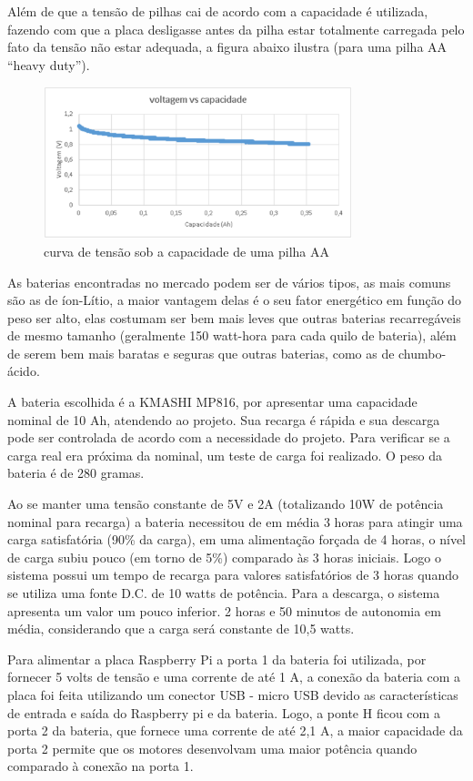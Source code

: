 Além de que a tensão de pilhas cai de acordo com a capacidade é utilizada, fazendo com que a placa desligasse antes da pilha estar
totalmente carregada pelo fato da tensão não estar adequada, a figura abaixo ilustra (para uma pilha AA “heavy duty”).

\begin{figure}[H]
    \centering
    \includegraphics[width=0.8\textwidth]{figuras/volt_vs_cap.eps}
    \caption{curva de tensão sob a capacidade de uma pilha AA}
    \label{fig:volts}
\end{figure}

As baterias encontradas no mercado podem ser de vários tipos, as mais comuns são as de íon-Lítio, a maior vantagem delas é o seu fator
energético em função do peso ser alto, elas costumam ser bem mais leves que outras baterias recarregáveis de mesmo tamanho (geralmente
150 watt-hora para cada quilo de bateria), além de serem bem mais baratas e seguras que outras baterias, como as de chumbo-ácido.

A bateria escolhida é a KMASHI MP816, por apresentar uma capacidade nominal de 10 Ah, atendendo ao projeto. Sua recarga é rápida e sua 
descarga pode ser controlada de acordo com a necessidade do projeto.  Para verificar se a carga real era próxima da nominal, um teste
de carga foi realizado. O peso da bateria é de 280 gramas.

Ao se manter uma tensão constante de 5V e 2A (totalizando 10W de potência nominal para recarga) a bateria necessitou de em média 3 horas
para atingir uma carga satisfatória (90\% da carga), em uma alimentação forçada de 4 horas, o nível de carga subiu pouco (em torno de 5\%)
comparado às 3 horas iniciais. Logo o sistema possui um tempo de recarga para valores satisfatórios de 3 horas quando se utiliza uma fonte
D.C. de 10 watts de potência. Para a descarga, o sistema apresenta um valor um pouco inferior. 2 horas e 50 minutos de autonomia em média,
considerando que a carga será constante de 10,5 watts.

Para alimentar a placa Raspberry Pi a porta 1 da bateria foi utilizada, por fornecer 5 volts de tensão e uma corrente de até 1 A, a
conexão da bateria com a placa foi feita utilizando um conector USB - micro USB devido as características de entrada e saída do Raspberry
pi e da bateria. Logo, a ponte H ficou com a porta 2 da bateria, que fornece uma corrente de até 2,1 A, a maior capacidade da porta 2
permite que os motores desenvolvam uma maior potência quando comparado à conexão na porta 1.

